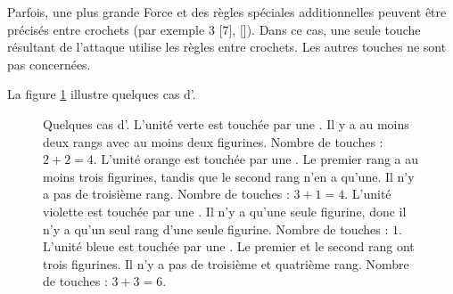 Parfois, une plus grande Force et des règles spéciales additionnelles peuvent être précisés entre crochets (par exemple \Strength{} 3 [7], []). Dans ce cas, une seule touche résultant de l'attaque utilise les règles entre crochets. Les autres touches ne sont pas concernées.

La figure \ref{figure/areaattack} illustre quelques cas d'\areaattack{}.

\newcommand{\figAAOneHit}{\normalfontsize{1 touche}}
\newcommand{\figAATwoHits}{\normalfontsize{2 touches}}
\newcommand{\figAAThreeHits}{\normalfontsize{3 touches}}
\newcommand{\figAATotalOneHit}{Total : 1 touche}
\newcommand{\figAATotalFourHits}{Total : 4 touches}
\newcommand{\figAATotalSixHits}{Total : 6 touches}
\newcommand{\figAAAreaAttack}[1]{\areaattack{#1}}

\begin{figure}[!htbp]
\centering
\hypertarget{areaattackfigure}{
\def\svgwidth{0.6\textwidth}

}
\caption{Quelques cas d'\areaattack{}.\vspace*{10pt}\newline
L'unité verte est touchée par une . Il y a au moins deux rangs avec au moins deux figurines.\newline
Nombre de touches : $ 2 + 2 = 4 $.\vspace*{10pt}\newline
L'unité orange est touchée par une . Le premier rang a au moins trois figurines, tandis que le second rang n'en a qu'une. Il n'y a pas de troisième rang.\newline
Nombre de touches : $ 3 + 1 = 4 $.\vspace*{10pt}\newline
L'unité violette est touchée par une . Il n'y a qu'une seule figurine, donc il n'y a qu'un seul rang d'une seule figurine.\newline
Nombre de touches : $ 1 $.\vspace*{10pt}\newline
L'unité bleue est touchée par une . Le premier et le second rang ont trois figurines. Il n'y a pas de troisième et quatrième rang.\newline
Nombre de touches : $ 3 + 3 = 6 $.%
}
\label{figure/areaattack}
\end{figure}


